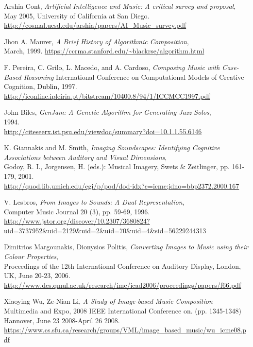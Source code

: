 \begin{thebibliography}{9}
 Arshia Cont,
 \emph{Artificial Intelligence and Music: A critical survey and proposal},\\
 May 2005, University of California at San Diego.\\
 \url{http://cosmal.ucsd.edu/arshia/papers/AI_Music_survey.pdf}

 Jhon A. Maurer,
 \emph{A Brief History of Algorithmic Composition},\\
 March, 1999.
 \url{https://ccrma.stanford.edu/~blackrse/algorithm.html}

 F. Pereira, C. Grilo, L. Macedo, and A. Cardoso,
 \emph{Composing Music with Case-Based Reasoning}
 International Conference on Computational Models of Creative Cognition, Dublin, 1997.
 \url{http://iconline.ipleiria.pt/bitstream/10400.8/94/1/ICCMCC1997.pdf}

 John Biles,
 \emph{GenJam: A Genetic Algorithm for Generating Jazz Solos},\\
 1994.\\
 \url{http://citeseerx.ist.psu.edu/viewdoc/summary?doi=10.1.1.55.6146}

 K. Giannakis and M. Smith,
 \emph{Imaging Soundscapes: Identifying Cognitive Associations between Auditory and Visual Dimensions},\\
 Godoy, R. I., Jorgensen, H. (eds.): Musical Imagery, Swets \& Zeitlinger, pp. 161-179, 2001.\\
 \url{http://quod.lib.umich.edu/cgi/p/pod/dod-idx?c=icmc;idno=bbp2372.2000.167}

 V. Lesbros,
 \emph{From Images to Sounds: A Dual Representation},\\
 Computer Music Journal 20 (3), pp. 59-69, 1996.\\
 \url{http://www.jstor.org/discover/10.2307/3680824?uid=3737952&uid=2129&uid=2&uid=70&uid=4&sid=56229244313}

 Dimitrios Margounakis, Dionysios Politis,
 \emph{Converting Images to Music using their Colour Properties},\\ 
 Proceedings of the 12th International Conference on Auditory Display, London, UK, June 20-23, 2006.\\
 \url{http://www.dcs.qmul.ac.uk/research/imc/icad2006/proceedings/papers/f66.pdf}

 Xiaoying Wu, Ze-Nian Li,
 \emph{A Study of Image-based Music Composition}
 Multimedia and Expo, 2008 IEEE International Conference on. (pp. 1345-1348)\\
 Hannover, June 23 2008-April 26 2008.\\
 \url{https://www.cs.sfu.ca/research/groups/VML/image_based_music/wu_icme08.pdf}


\end{thebibliography}
